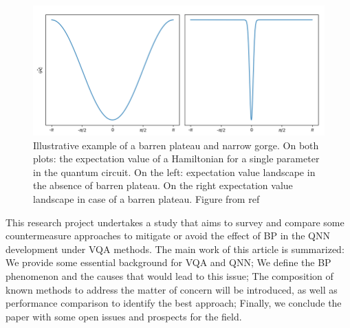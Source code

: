 \begin{figure}[h]
    \centering
    \includegraphics[width=\textwidth]{src/Appendices/example-of-a-barren-plateau.png}
    \caption{
        Illustrative example of a barren plateau and narrow gorge.
        On both plots: the expectation value of a Hamiltonian for a single parameter in the quantum circuit.
        On the left: expectation value landscape in the absence of barren plateau. 
        On the right expectation value landscape in case of a barren plateau.
        Figure from ref \cite{tillyVariationalQuantumEigensolver2021}
    }
    \label{fig: Barren Plateau Example}
\end{figure}



This research project undertakes a study that aims to survey and compare some countermeasure approaches to mitigate or avoid the effect of BP in the QNN development under VQA methods. 
The main work of this article is summarized: 
We provide some essential background for VQA and QNN;
We define the BP phenomenon and the causes that would lead to this issue; 
The composition of known methods to address the matter of concern will be introduced, as well as performance comparison to identify the best approach; 
Finally, we conclude the paper with some open issues and prospects for the field.
